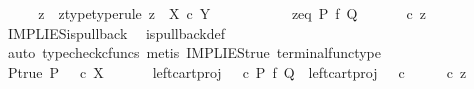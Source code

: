 \begin{isabellebody}
%
\isadelimproof
%
\endisadelimproof
%
\isatagproof
{}\isamarkupfalse%
\ {\isacharminus}{\kern0pt}\isanewline
\ \ \isamarkupfalse%
\ z\ \ z{\isacharunderscore}{\kern0pt}type{\isacharbrackleft}{\kern0pt}type{\isacharunderscore}{\kern0pt}rule{\isacharbrackright}{\kern0pt}{\isacharcolon}{\kern0pt}\ {\isachardoublequoteopen}z\ {\isacharcolon}{\kern0pt}\ X\ {\isasymtimes}\isactrlsub c\ Y\ {\isasymrightarrow}\ {\isasymone}\ {\isasymCoprod}\ {\isasymone}\ {\isasymCoprod}\ {\isasymone}{\isachardoublequoteclose}\isanewline
\ \ \ \ \ z{\isacharunderscore}{\kern0pt}eq{\isacharcolon}{\kern0pt}\ {\isachardoublequoteopen}P\ {\isasymtimes}\isactrlsub f\ Q\ {\isacharequal}{\kern0pt}\ {\isacharparenleft}{\kern0pt}{\isasymlangle}{\isasymt}{\isacharcomma}{\kern0pt}{\isasymt}{\isasymrangle}\ {\isasymamalg}\ {\isasymlangle}{\isasymf}{\isacharcomma}{\kern0pt}{\isasymf}{\isasymrangle}\ {\isasymamalg}\ {\isasymlangle}{\isasymf}{\isacharcomma}{\kern0pt}{\isasymt}{\isasymrangle}{\isacharparenright}{\kern0pt}\ {\isasymcirc}\isactrlsub c\ z{\isachardoublequoteclose}\isanewline
\ \ \ \ \isamarkupfalse%
\ IMPLIES{\isacharunderscore}{\kern0pt}is{\isacharunderscore}{\kern0pt}pullback\ \isamarkupfalse%
\ is{\isacharunderscore}{\kern0pt}pullback{\isacharunderscore}{\kern0pt}def\isanewline
\ \ \ \ \isamarkupfalse%
\ {\isacharparenleft}{\kern0pt}auto{\isacharcomma}{\kern0pt}\ typecheck{\isacharunderscore}{\kern0pt}cfuncs{\isacharcomma}{\kern0pt}\ metis\ IMPLIES{\isacharunderscore}{\kern0pt}true\ terminal{\isacharunderscore}{\kern0pt}func{\isacharunderscore}{\kern0pt}type{\isacharparenright}{\kern0pt}\ \ \isanewline
\ \ \isamarkupfalse%
\ P{\isacharunderscore}{\kern0pt}true{\isacharcolon}{\kern0pt}\ {\isachardoublequoteopen}P\ {\isacharequal}{\kern0pt}\ {\isasymt}\ {\isasymcirc}\isactrlsub c\ {\isasymbeta}\isactrlbsub X\isactrlesub {\isachardoublequoteclose}\isanewline
\ \ \isanewline
\ \ \isamarkupfalse%
\ {\isachardoublequoteopen}left{\isacharunderscore}{\kern0pt}cart{\isacharunderscore}{\kern0pt}proj\ {\isasymOmega}\ {\isasymOmega}\ {\isasymcirc}\isactrlsub c\ {\isacharparenleft}{\kern0pt}P\ {\isasymtimes}\isactrlsub f\ Q{\isacharparenright}{\kern0pt}\ {\isacharequal}{\kern0pt}\ left{\isacharunderscore}{\kern0pt}cart{\isacharunderscore}{\kern0pt}proj\ {\isasymOmega}\ {\isasymOmega}\ {\isasymcirc}\isactrlsub c\ {\isacharparenleft}{\kern0pt}{\isasymlangle}{\isasymt}{\isacharcomma}{\kern0pt}{\isasymt}{\isasymrangle}\ {\isasymamalg}\ {\isasymlangle}{\isasymf}{\isacharcomma}{\kern0pt}{\isasymf}{\isasymrangle}\ {\isasymamalg}\ {\isasymlangle}{\isasymf}{\isacharcomma}{\kern0pt}{\isasymt}{\isasymrangle}{\isacharparenright}{\kern0pt}\ {\isasymcirc}\isactrlsub c\ z{\isachardoublequoteclose}\isanewline

\end{isabellebody}
